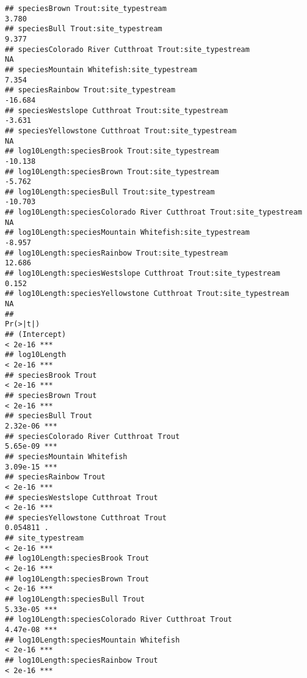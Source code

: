 \documentclass[
  landscape]{article}
\begin{document}
\begin{verbatim}
## speciesBrown Trout:site_typestream                                   3.780
## speciesBull Trout:site_typestream                                    9.377
## speciesColorado River Cutthroat Trout:site_typestream                   NA
## speciesMountain Whitefish:site_typestream                            7.354
## speciesRainbow Trout:site_typestream                               -16.684
## speciesWestslope Cutthroat Trout:site_typestream                    -3.631
## speciesYellowstone Cutthroat Trout:site_typestream                      NA
## log10Length:speciesBrook Trout:site_typestream                     -10.138
## log10Length:speciesBrown Trout:site_typestream                      -5.762
## log10Length:speciesBull Trout:site_typestream                      -10.703
## log10Length:speciesColorado River Cutthroat Trout:site_typestream       NA
## log10Length:speciesMountain Whitefish:site_typestream               -8.957
## log10Length:speciesRainbow Trout:site_typestream                    12.686
## log10Length:speciesWestslope Cutthroat Trout:site_typestream         0.152
## log10Length:speciesYellowstone Cutthroat Trout:site_typestream          NA
##                                                                   Pr(>|t|)    
## (Intercept)                                                        < 2e-16 ***
## log10Length                                                        < 2e-16 ***
## speciesBrook Trout                                                 < 2e-16 ***
## speciesBrown Trout                                                 < 2e-16 ***
## speciesBull Trout                                                 2.32e-06 ***
## speciesColorado River Cutthroat Trout                             5.65e-09 ***
## speciesMountain Whitefish                                         3.09e-15 ***
## speciesRainbow Trout                                               < 2e-16 ***
## speciesWestslope Cutthroat Trout                                   < 2e-16 ***
## speciesYellowstone Cutthroat Trout                                0.054811 .  
## site_typestream                                                    < 2e-16 ***
## log10Length:speciesBrook Trout                                     < 2e-16 ***
## log10Length:speciesBrown Trout                                     < 2e-16 ***
## log10Length:speciesBull Trout                                     5.33e-05 ***
## log10Length:speciesColorado River Cutthroat Trout                 4.47e-08 ***
## log10Length:speciesMountain Whitefish                              < 2e-16 ***
## log10Length:speciesRainbow Trout                                   < 2e-16 ***

\end{verbatim}
\end{document}
